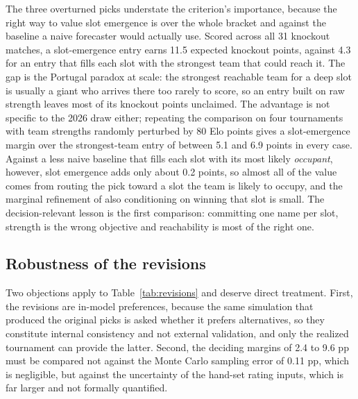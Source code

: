\documentclass[11pt,a4paper]{article}
\begin{document}
The three overturned picks understate the criterion's importance, because the right way to value slot emergence is over the whole bracket and against the baseline a naive forecaster would actually use. Scored across all 31 knockout matches, a slot-emergence entry earns 11.5 expected knockout points, against 4.3 for an entry that fills each slot with the strongest team that could reach it. The gap is the Portugal paradox at scale: the strongest reachable team for a deep slot is usually a giant who arrives there too rarely to score, so an entry built on raw strength leaves most of its knockout points unclaimed. The advantage is not specific to the 2026 draw either; repeating the comparison on four tournaments with team strengths randomly perturbed by 80 Elo points gives a slot-emergence margin over the strongest-team entry of between 5.1 and 6.9 points in every case. Against a less naive baseline that fills each slot with its most likely \emph{occupant}, however, slot emergence adds only about 0.2 points, so almost all of the value comes from routing the pick toward a slot the team is likely to occupy, and the marginal refinement of also conditioning on winning that slot is small. The decision-relevant lesson is the first comparison: committing one name per slot, strength is the wrong objective and reachability is most of the right one.

\subsection{Robustness of the revisions}\label{sec:robust}

Two objections apply to Table~\ref{tab:revisions} and deserve direct treatment. First, the revisions are in-model preferences, because the same simulation that produced the original picks is asked whether it prefers alternatives, so they constitute internal consistency and not external validation, and only the realized tournament can provide the latter. Second, the deciding margins of 2.4 to 9.6 pp must be compared not against the Monte Carlo sampling error of 0.11 pp, which is negligible, but against the uncertainty of the hand-set rating inputs, which is far larger and not formally quantified.
\end{document}
